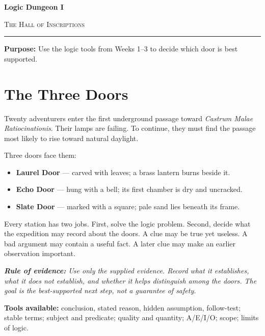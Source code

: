 \documentclass[12pt]{article}
\newcommand{\cluebox}[1]{%
\par\vspace{0.12em}\noindent\begin{minipage}{\textwidth}\itshape #1\end{minipage}\par\vspace{0.12em}}
\begin{document}
\begin{center}
{\LARGE\bfseries Logic Dungeon I}\par\vspace{0.04em}
{\large\scshape The Hall of Inscriptions}\par\vspace{0.08em}
\rule{0.78\textwidth}{0.5pt}\par\vspace{0.12em}
\end{center}

\textbf{Purpose:} Use the logic tools from Weeks 1--3 to decide which door is best supported.

\section*{The Three Doors}

Twenty adventurers enter the first underground passage toward \textit{Castrum Malae Ratiocinationis}. Their lamps are failing. To continue, they must find the passage most likely to rise toward natural daylight.

Three doors face them:

\begin{itemize}[leftmargin=1.5em,itemsep=0.1em]
\item \textbf{Laurel Door} --- carved with leaves; a brass lantern burns beside it.
\item \textbf{Echo Door} --- hung with a bell; its first chamber is dry and uncracked.
\item \textbf{Slate Door} --- marked with a square; pale sand lies beneath its frame.
\end{itemize}

Every station has two jobs. First, solve the logic problem. Second, decide what the expedition may record about the doors. A clue may be true yet useless. A bad argument may contain a useful fact. A later clue may make an earlier observation important.

\cluebox{\textbf{Rule of evidence:} Use only the supplied evidence. Record what it establishes, what it does not establish, and whether it helps distinguish among the doors. The goal is the \emph{best-supported next step}, not a guarantee of safety.}

\vspace{0.3em}
\textbf{Tools available:} conclusion, stated reason, hidden assumption, follow-test; stable terms; subject and predicate; quality and quantity; A/E/I/O; scope; limits of logic.
\end{document}
